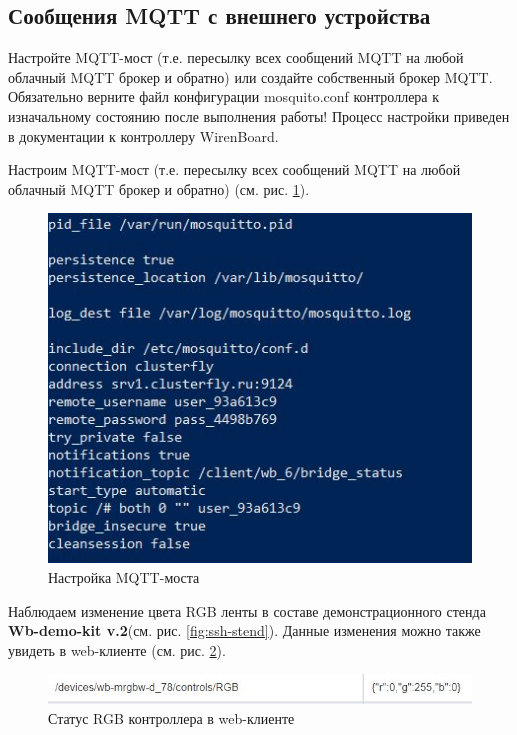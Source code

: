 \documentclass[a4paper,14pt]{extarticle}
\newcommand{\stend}{\textbf{Wb-demo-kit v.2}}
\begin{document}
\subsection{Сообщения MQTT с внешнего устройства}
\begin{problem}
	Настройте MQTT-мост (т.е. пересылку всех сообщений MQTT на любой облачный MQTT
	брокер и обратно) или создайте собственный брокер MQTT.
	Обязательно верните файл конфигурации mosquito.conf контроллера к изначальному
	состоянию после выполнения работы!
	Процесс настройки приведен в документации к контроллеру WirenBoard.
	
	\nonum
	
	Настроим MQTT-мост (т.е. пересылку всех сообщений MQTT на любой облачный MQTT
	брокер и обратно) (см. рис. \ref{fig:ssh-config}).
	\begin{figure}[htbp]
		\centering
		\includegraphics[width=0.6\linewidth]{images/ssh-powershell4}
		\caption{Настройка MQTT-моста}
		\label{fig:ssh-config}
	\end{figure}
	
	Наблюдаем изменение цвета RGB ленты в составе демонстрационного стенда \stend (см. рис. \ref{fig:ssh-stend}). Данные изменения можно также увидеть в web-клиенте (см. рис. \ref{fig:ssh-web-client}).
	
	\begin{figure}[htbp]
		\centering
		\includegraphics[width=0.7\linewidth]{images/ssh-powershell4.2}
		\caption{Статус RGB контроллера в web-клиенте}
		\label{fig:ssh-web-client}
	\end{figure}
	

\end{problem}
\end{document}
